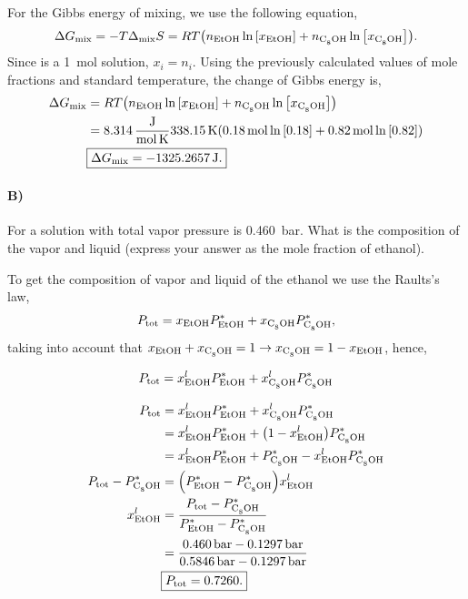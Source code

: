 \documentclass[main.tex]{subfiles}
\begin{document}
For the Gibbs energy of mixing, we use the following equation,
\begin{gather*}
    \Delta G_{\mathrm{mix}} = -T\Delta_{\mathrm{mix}}S = RT\qty(n_{\mathrm{EtOH}} \ln\qty[x_{\mathrm{EtOH}}] + n_{\ce{C8OH}} \ln\qty[x_{\ce{C8OH}}]).
\end{gather*}
Since is a \SI{1}{\mole} solution, $x_i=n_i$.
Using the previously calculated values of mole fractions and standard temperature, the change of Gibbs energy is,
\begin{align*}
    \Delta G_{\mathrm{mix}} &= RT\qty(n_{\mathrm{EtOH}} \ln\qty[x_{\mathrm{EtOH}}] + n_{\ce{C8OH}} \ln\qty[x_{\ce{C8OH}}]) \\
    &= \SI[per-mode=fraction]{8.314}{\joule\per\mole\per\kelvin}\SI{338.15}{\kelvin}\qty(\SI{0.18}{\mole}\ln\qty[0.18] + \SI{0.82}{\mole}\ln\qty[0.82]) \\
    & \boxed{\Delta G_{\mathrm{mix}} = -\SI{1325.2657}{\joule}.}
\end{align*}

\paragraph{B)} For a solution with total vapor pressure is \SI{0.460}{\bar}.
What is the composition of the vapor and liquid (express your answer as the mole fraction of ethanol).

To get the composition of vapor and liquid of the ethanol we use the Raults's law,
\begin{gather*}
    P_\mathrm{tot} = x_{\mathrm{EtOH}} P^*_{\mathrm{EtOH}} + x_{\ce{C8OH}} P^*_{\ce{C8OH}},
\end{gather*}
taking into account that $x_{\mathrm{EtOH}} + x_{\ce{C8OH}} = 1\rightarrow x_{\ce{C8OH}} = 1 - x_{\mathrm{EtOH}}$, hence,

\begin{align*}
    P_\mathrm{tot} &= x^l_{\mathrm{EtOH}} P^*_{\mathrm{EtOH}} + x^l_{\ce{C8OH}} P^*_{\ce{C8OH}} \\
\end{align*}

\begin{align*}
    P_\mathrm{tot} &= x^l_{\mathrm{EtOH}} P^*_{\mathrm{EtOH}} + x^l_{\ce{C8OH}} P^*_{\ce{C8OH}} \\
    &= x^l_{\mathrm{EtOH}} P^*_{\mathrm{EtOH}} + \qty(1 - x^l_{\mathrm{EtOH}}) P^*_{\ce{C8OH}} \\
    &= x^l_{\mathrm{EtOH}} P^*_{\mathrm{EtOH}} + P^*_{\ce{C8OH}} - x^l_{\mathrm{EtOH}}P^*_{\ce{C8OH}} \\
    P_\mathrm{tot} - P^*_{\ce{C8OH}} &= \qty(P^*_{\mathrm{EtOH}} - P^*_{\ce{C8OH}})x^l_{\mathrm{EtOH}} \\
    x^l_{\mathrm{EtOH}} &= \frac{P_\mathrm{tot} - P^*_{\ce{C8OH}}}{P^*_{\mathrm{EtOH}} - P^*_{\ce{C8OH}}} \\
    &= \frac{\SI{0.460}{\bar} - \SI{0.1297}{\bar}}{\SI{0.5846}{\bar} - \SI{0.1297}{\bar}} \\
    &\boxed{P_\mathrm{tot} = 0.7260.}
\end{align*}
\end{document}
